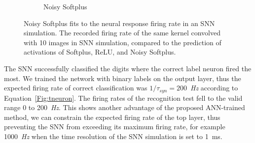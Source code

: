\documentclass{article}
\begin{document}
\begin{figure}[hb!]
\begin{subfigure}[hb]{0.32\textwidth}
		\caption{Noisy Softplus}
	\end{subfigure}
		\caption{Noisy Softplus fits to the neural response firing rate in an SNN simulation.
			The recorded firing rate of the same kernel convolved with 10 images in SNN simulation, compared to the prediction of activations of Softplus, ReLU, and Noisy Softplus.}
		\label{fig:af_compare}
\end{figure}		

The SNN successfully classified the digits where the correct label neuron fired the most.
We trained the network with binary labels on the output layer, thus the expected firing rate of correct classification was $1/\tau_{syn}=200$~\textit{Hz} according to Equation~\ref{Fig:tneuron}.
The firing rates of the recognition test fell to the valid range 0 to 200~\textit{Hz}.
This shows another advantage of the proposed ANN-trained method, we can constrain the expected firing rate of the top layer, thus preventing the SNN from exceeding its maximum firing rate, for example 1000~\textit{Hz} when the time resolution of the SNN simulation is set to 1~ms.
\end{document}
